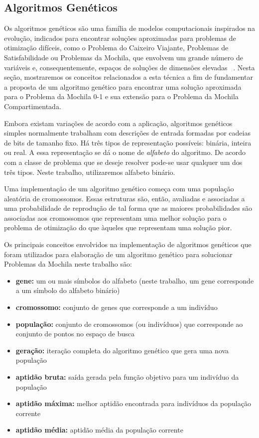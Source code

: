 \subsection{Algoritmos Genéticos} \label{algen}

Os algoritmos genéticos são uma família de modelos computacionais inspirados na evolução, indicados para encontrar soluções aproximadas para problemas de otimização difíceis, como o Problema do Caixeiro Viajante, Problemas de Satisfabilidade ou Problemas da Mochila, que envolvem um grande número de variáveis e, consequentemente, espaços de soluções de dimensões elevadas ~\cite{Wei09}. Nesta seção, mostraremos os conceitos relacionados a esta técnica a fim de fundamentar a proposta de um algoritmo genético para encontrar uma solução aproximada para o Problema da Mochila 0-1 e sua extensão para o Problema da Mochila Compartimentada.

Embora existam variações de acordo com a aplicação, algoritmos genéticos simples normalmente trabalham com descrições de entrada formadas por cadeias de bits de tamanho fixo.  Há três tipos de representação possíveis: binária, inteira ou real. A essa representação se dá o nome de {\it alfabeto} do algoritmo. De acordo com a classe de problema que se deseje resolver pode-se usar qualquer um dos três tipos. Neste trabalho, utilizaremos alfabeto binário. 

Uma implementação de um algoritmo genético começa com uma população aleatória de cromossomos. Essas estruturas são, então, avaliadas e associadas a uma probabilidade de reprodução de tal forma que as maiores probabilidades são associadas aos cromossomos que representam uma melhor solução para o problema de otimização do que àqueles que representam uma solução pior.

Os principais conceitos envolvidos na implementação de algoritmos genéticos que foram utilizados para elaboração de um algoritmo genético para solucionar Problemas da Mochila neste trabalho são:
\begin{itemize}
\item {\bf gene:} um ou mais símbolos do alfabeto (neste trabalho, um gene corresponde a um símbolo do alfabeto binário)
\item {\bf cromossomo:} conjunto de genes que corresponde a um indivíduo
\item {\bf população:} conjunto de cromossomos (ou indivíduos) que corresponde ao conjunto de pontos no espaço de busca 
\item {\bf geração:} iteração completa do algoritmo genético que gera uma nova população 
\item {\bf aptidão bruta:} saída gerada pela função objetivo para um indivíduo da população 
\item {\bf aptidão máxima:} melhor aptidão encontrada para indivíduos da população corrente 
\item {\bf aptidão média:} aptidão média da população corrente 
\end{itemize}

